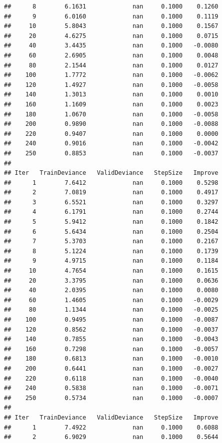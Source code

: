 \documentclass[]{book}
\begin{document}
\begin{verbatim}
##      8        6.1631             nan     0.1000    0.1260
##      9        6.0160             nan     0.1000    0.1119
##     10        5.8043             nan     0.1000    0.1567
##     20        4.6275             nan     0.1000    0.0715
##     40        3.4435             nan     0.1000   -0.0080
##     60        2.6905             nan     0.1000    0.0048
##     80        2.1544             nan     0.1000    0.0127
##    100        1.7772             nan     0.1000   -0.0062
##    120        1.4927             nan     0.1000   -0.0058
##    140        1.3013             nan     0.1000    0.0010
##    160        1.1609             nan     0.1000    0.0023
##    180        1.0670             nan     0.1000   -0.0058
##    200        0.9890             nan     0.1000   -0.0088
##    220        0.9407             nan     0.1000    0.0000
##    240        0.9016             nan     0.1000   -0.0042
##    250        0.8853             nan     0.1000   -0.0037
## 
## Iter   TrainDeviance   ValidDeviance   StepSize   Improve
##      1        7.6412             nan     0.1000    0.5298
##      2        7.0819             nan     0.1000    0.4917
##      3        6.5521             nan     0.1000    0.3297
##      4        6.1791             nan     0.1000    0.2744
##      5        5.9412             nan     0.1000    0.1842
##      6        5.6434             nan     0.1000    0.2504
##      7        5.3703             nan     0.1000    0.2167
##      8        5.1224             nan     0.1000    0.1739
##      9        4.9715             nan     0.1000    0.1184
##     10        4.7654             nan     0.1000    0.1615
##     20        3.3795             nan     0.1000    0.0636
##     40        2.0395             nan     0.1000    0.0080
##     60        1.4605             nan     0.1000   -0.0029
##     80        1.1344             nan     0.1000   -0.0025
##    100        0.9495             nan     0.1000   -0.0087
##    120        0.8562             nan     0.1000   -0.0037
##    140        0.7855             nan     0.1000   -0.0043
##    160        0.7298             nan     0.1000   -0.0057
##    180        0.6813             nan     0.1000   -0.0010
##    200        0.6441             nan     0.1000   -0.0027
##    220        0.6118             nan     0.1000   -0.0040
##    240        0.5838             nan     0.1000   -0.0071
##    250        0.5734             nan     0.1000   -0.0007
## 
## Iter   TrainDeviance   ValidDeviance   StepSize   Improve
##      1        7.4922             nan     0.1000    0.6088
##      2        6.9029             nan     0.1000    0.5644

\end{verbatim}
\end{document}

